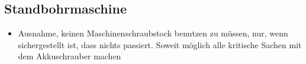 \documentclass[13pt]{\basedir/fablab-document}
\begin{document}
\subsection{Standbohrmaschine}
\begin{itemize}
	\item Ausnahme, keinen Maschinenschraubstock benutzen zu müssen, nur, wenn sichergestellt ist, dass nichts passiert. Soweit möglich alle kritische Sachen mit dem Akkuschrauber machen
\end{itemize}

\end{document}

